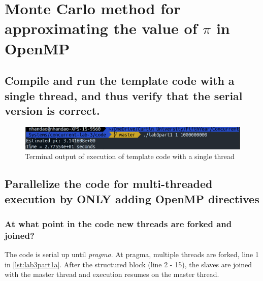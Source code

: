 
\section{Monte Carlo method for approximating the value of $\pi$ in OpenMP}

\subsection{Compile and run the template code with a single thread, and thus verify that the serial
version is correct.}

\begin{figure}[ht]
    \centering
    \includegraphics[width=\textwidth]{graphics/P1_a_terminal_output.png}
    \caption{Terminal output of execution of template code with a single thread}
    \label{fig:P1_a_term_out}
\end{figure}

\subsection{Parallelize the code for multi-threaded execution by ONLY adding OpenMP directives}

\vspace{0.5cm}

    
\subsubsection{At what point in the code new threads are forked and joined?}
The code is serial up until \emph{pragma}. At pragma, multiple threads are forked,
line 1 in \cref{lst:lab3part1a}. After the structured block (line 2 - 15), the slaves are joined with 
the master thread and execution resumes on the master thread.

